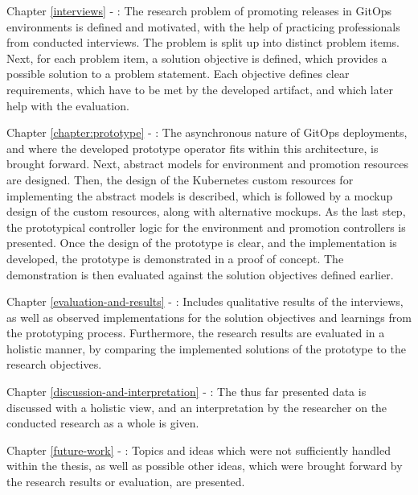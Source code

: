 Chapter \ref{interviews} - :
The research problem of promoting releases in GitOps environments is defined and motivated,
with the help of practicing professionals from conducted interviews.
The problem is split up into distinct problem items.
Next, for each problem item,
a solution objective is defined, which provides a possible solution to a problem statement.
Each objective defines clear requirements, which have to be met by the developed artifact,
and which later help with the evaluation.

Chapter \ref{chapter:prototype} - :
The asynchronous nature of GitOps deployments,
and where the developed prototype operator fits within this architecture, is brought forward.
Next, abstract models for environment and promotion resources are designed.
Then, the design of the Kubernetes custom resources for implementing the abstract models is described,
which is followed by a mockup design of the custom resources, along with alternative mockups.
As the last step,
the prototypical controller logic for the environment and promotion controllers is presented.
Once the design of the prototype is clear, and the implementation is developed,
the prototype is demonstrated in a proof of concept.
The demonstration is then evaluated against the solution objectives defined earlier.

Chapter \ref{evaluation-and-results} - :
Includes qualitative results of the interviews, as well as observed implementations
for the solution objectives and learnings from the prototyping process.
Furthermore, the research results are evaluated in a holistic manner,
by comparing the implemented solutions of the prototype to the research objectives.

Chapter \ref{discussion-and-interpretation} - :
The thus far presented data is discussed with a holistic view,
and an interpretation by the researcher on the conducted research as a whole is given.

Chapter \ref{future-work} - :
Topics and ideas which were not sufficiently handled within the thesis,
as well as possible other ideas, which were brought forward by the research results or evaluation,
are presented.

